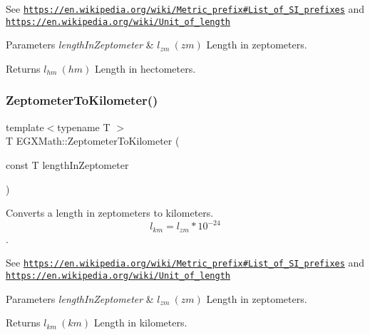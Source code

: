 See \href{https://en.wikipedia.org/wiki/Metric_prefix#List_of_SI_prefixes}{\tt https\+://en.\+wikipedia.\+org/wiki/\+Metric\+\_\+prefix\#\+List\+\_\+of\+\_\+\+S\+I\+\_\+prefixes} and \href{https://en.wikipedia.org/wiki/Unit_of_length}{\tt https\+://en.\+wikipedia.\+org/wiki/\+Unit\+\_\+of\+\_\+length} 
\begin{DoxyParams}{Parameters}
{\em length\+In\+Zeptometer} & $ l_{zm}\ (zm)$ Length in zeptometers. \\
\hline
\end{DoxyParams}
\begin{DoxyReturn}{Returns}
$ l_{hm}\ (hm)$ Length in hectometers. 
\end{DoxyReturn}
\mbox{\label{group___e_g_x_math-_conversions-_length_conversions-_s_i-_zeptometer-_s_i_ga687dc5d33c63561c87a06568fd928da9}} 
\subsubsection{\texorpdfstring{Zeptometer\+To\+Kilometer()}{ZeptometerToKilometer()}}
{\footnotesize\ttfamily template$<$typename T $>$ \\
T E\+G\+X\+Math\+::\+Zeptometer\+To\+Kilometer (\begin{DoxyParamCaption}\item[{const T}]{length\+In\+Zeptometer }\end{DoxyParamCaption})}



Converts a length in zeptometers to kilometers. \[ l_{km}=l_{zm} * 10^{-24} \]. 

See \href{https://en.wikipedia.org/wiki/Metric_prefix#List_of_SI_prefixes}{\tt https\+://en.\+wikipedia.\+org/wiki/\+Metric\+\_\+prefix\#\+List\+\_\+of\+\_\+\+S\+I\+\_\+prefixes} and \href{https://en.wikipedia.org/wiki/Unit_of_length}{\tt https\+://en.\+wikipedia.\+org/wiki/\+Unit\+\_\+of\+\_\+length} 
\begin{DoxyParams}{Parameters}
{\em length\+In\+Zeptometer} & $ l_{zm}\ (zm)$ Length in zeptometers. \\
\hline
\end{DoxyParams}
\begin{DoxyReturn}{Returns}
$ l_{km}\ (km)$ Length in kilometers. 
\end{DoxyReturn}
\mbox{\label{group___e_g_x_math-_conversions-_length_conversions-_s_i-_zeptometer-_s_i_ga53c621beeed03e51c3ad8a5cc267a35f}} 
